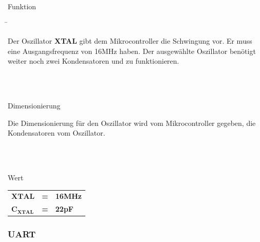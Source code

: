 \begin{tabbing}
\parbox[t]{.25\textwidth}{

Funktion

} \=\parbox[t]{.75\textwidth}{

Der Oszillator \textbf{XTAL} gibt dem Mikrocontroller die Schwingung vor. Er muss eine Ausgangsfrequenz von 16MHz haben. Der ausgewählte Oszillator benötigt weiter noch zwei Kondensatoren und zu funktionieren.

}\\
\\
\parbox[t]{.25\textwidth}{

Dimensionierung

} \>\parbox[t]{.75\textwidth}{

Die Dimensionierung für den Oszillator wird vom Mikrocontroller gegeben, die Kondensatoren vom Oszillator.

}\\
\\
\parbox[t]{.25\textwidth}{

Wert

} \>\parbox[t]{.75\textwidth}{

\begin{tabular}{lll}
$\mathbf{XTAL}$ & \textbf{=} &  \textbf{16MHz} \\
$\mathbf{C_{XTAL}}$ & \textbf{=} &  \textbf{22pF} \\
\end{tabular}

}
\end{tabbing}

\subsubsection{UART}\label{subsubsec:UART_Mikrocontroller}

